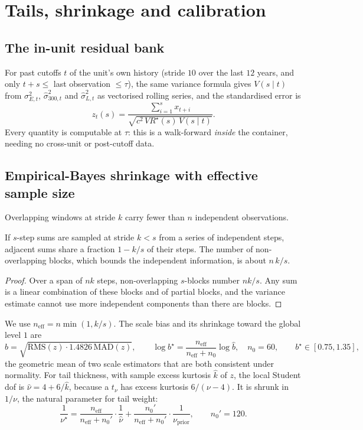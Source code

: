\section{Tails, shrinkage and calibration}\label{sec:tails}

\subsection{The in-unit residual bank}

For past cutoffs $t$ of the unit's own history (stride $10$ over the last $12$ years, and only $t+s\le$ last observation $\le\tau$), the same
variance formula gives $V(s\mid t)$ from $\sigma^2_{E,t}$, $\hat\sigma^2_{300,t}$ and $\hat\sigma^2_{L,t}$ as vectorised rolling series, and the
standardised error is
\begin{equation}
  z_t(s)=\frac{\sum_{i=1}^s x_{t+i}}{\sqrt{c^2\,VR^\star(s)\,V(s\mid t)}} .
\end{equation}
Every quantity is computable at $\tau$: this is a walk-forward \emph{inside} the container, needing no cross-unit or post-cutoff data.

\subsection{Empirical-Bayes shrinkage with effective sample size}

Overlapping windows at stride $k$ carry fewer than $n$ independent observations.

\begin{lemma}
If $s$-step sums are sampled at stride $k<s$ from a series of independent steps, adjacent sums share a fraction $1-k/s$ of their steps. The
number of non-overlapping blocks, which bounds the independent information, is about $n\,k/s$.
\end{lemma}
\begin{proof}
Over a span of $nk$ steps, non-overlapping $s$-blocks number $nk/s$. Any sum is a linear combination of these blocks and of partial blocks, and
the variance estimate cannot use more independent components than there are blocks.
\end{proof}
We use $n_{\mathrm{eff}}=n\min(1,k/s)$. The scale bias and its shrinkage toward the global level $1$ are
\begin{equation}
  \hat b=\sqrt{\mathrm{RMS}(z)\cdot1.4826\,\mathrm{MAD}(z)},\qquad
  \log b^\star=\frac{n_{\mathrm{eff}}}{n_{\mathrm{eff}}+n_0}\log\hat b,\quad n_0=60,\qquad b^\star\in[0.75,1.35],
\end{equation}
the geometric mean of two scale estimators that are both consistent under normality. For tail thickness, with sample excess kurtosis $\hat k$ of
$z$, the local Student dof is $\hat\nu=4+6/\hat k$, because a $t_\nu$ has excess kurtosis $6/(\nu-4)$. It is shrunk in $1/\nu$, the natural
parameter for tail weight:
\begin{equation}
  \frac1{\nu^\star}=\frac{n_{\mathrm{eff}}}{n_{\mathrm{eff}}+n_0'}\cdot\frac1{\hat\nu}+\frac{n_0'}{n_{\mathrm{eff}}+n_0'}\cdot\frac1{\nu_{\mathrm{prior}}},\qquad n_0'=120 .
\end{equation}

